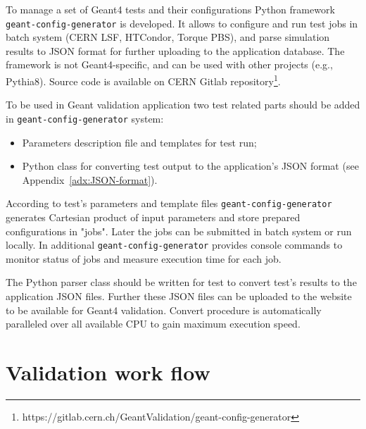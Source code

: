 To manage a set of Geant4 tests and their configurations Python framework {\tt geant-config-generator} is developed. It allows to configure and run test jobs in batch system (CERN LSF, HTCondor, Torque PBS), and parse simulation results to JSON format for further uploading to the application database.
The framework is not Geant4-specific, and can be used with other projects (e.g., Pythia8). Source code is available on
CERN Gitlab repository\footnote{https://gitlab.cern.ch/GeantValidation/geant-config-generator}.

To be used in Geant validation application two test related parts should be added in {\tt geant-config-generator} system:

\begin{itemize}
	\item Parameters description file and templates for test run;
	\item Python class for converting test output to the application's JSON format (see Appendix~\ref{adx:JSON-format}).
\end{itemize}

According to test's parameters and template files {\tt geant-config-generator} generates Cartesian product of input parameters and store prepared configurations in "jobs". Later the jobs can be submitted in batch system or run locally. In additional {\tt geant-config-generator} provides console commands to monitor status of jobs and measure execution time for each job.

The Python parser class should be written for test to convert test's results to the application JSON files. Further these JSON files can be uploaded to the website to be available for Geant4 validation.
Convert procedure is automatically paralleled over all available CPU to gain maximum execution speed.






\section{Validation work flow}
\label{sec-workflow}

